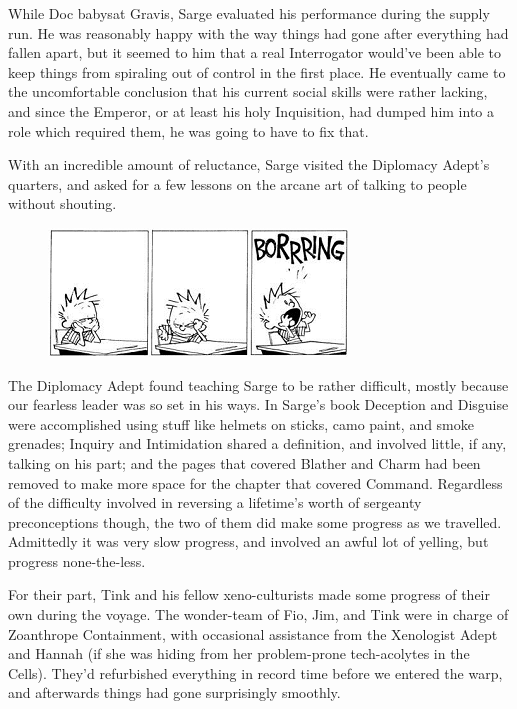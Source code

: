 While Doc babysat Gravis, Sarge evaluated his performance during the supply run. 
He was reasonably happy with the way things had gone after everything had fallen apart, but it seemed to him that a real Interrogator would've been able to keep things from spiraling out of control in the first place. 
He eventually came to the uncomfortable conclusion that his current social skills were rather lacking, and since the Emperor, or at least his holy Inquisition, had dumped him into a role which required them, he was going to have to fix that.

With an incredible amount of reluctance, Sarge visited the Diplomacy Adept's quarters, and asked for a few lessons on the arcane art of talking to people without shouting.

\begin{figure}
	\begin{center}
		\includegraphics[width=\figwidth]{pics/15/8.png}
	\end{center}
\end{figure}
The Diplomacy Adept found teaching Sarge to be rather difficult, mostly because our fearless leader was so set in his ways. 
In Sarge's book Deception and Disguise were accomplished using stuff like helmets on sticks, camo paint, and smoke grenades; 
Inquiry and Intimidation shared a definition, and involved little, if any, talking on his part; 
and the pages that covered Blather and Charm had been removed to make more space for the chapter that covered Command. 
Regardless of the difficulty involved in reversing a lifetime's worth of sergeanty preconceptions though, the two of them did make some progress as we travelled. 
Admittedly it was very slow progress, and involved an awful lot of yelling, but progress none-the-less.

For their part, Tink and his fellow xeno-culturists made some progress of their own during the voyage. 
The wonder-team of Fio, Jim, and Tink were in charge of Zoanthrope Containment, with occasional assistance from the Xenologist Adept and Hannah (if she was hiding from her problem-prone tech-acolytes in the Cells). 
They'd refurbished everything in record time before we entered the warp, and afterwards things had gone surprisingly smoothly. 


